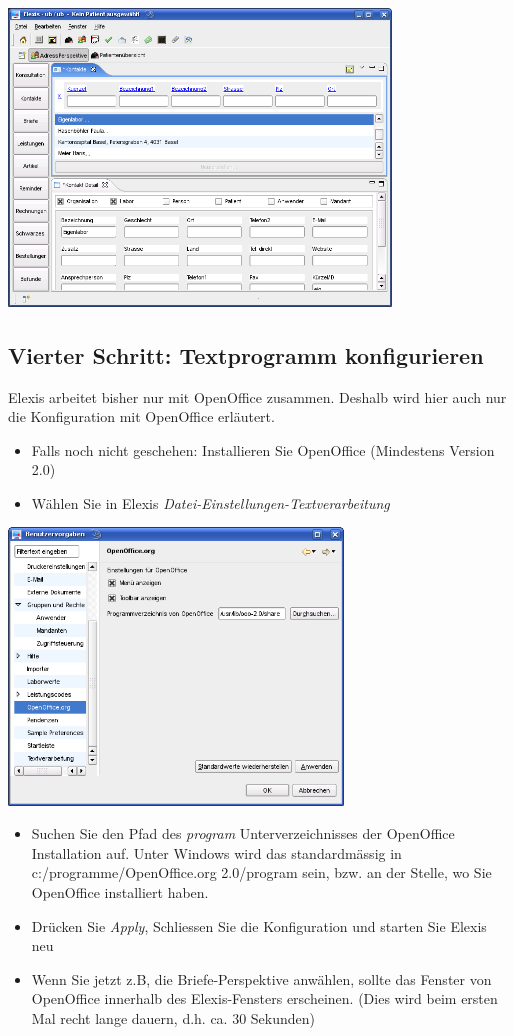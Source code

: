\includegraphics[width=4in]{images/grundkonfmand1.png}
\subsection{Vierter Schritt: Textprogramm konfigurieren}

Elexis arbeitet bisher nur mit OpenOffice zusammen. Deshalb wird hier auch nur die Konfiguration mit OpenOffice erläutert.

\begin{itemize}
 \item Falls noch nicht geschehen: Installieren Sie OpenOffice (Mindestens Version 2.0)
 \item Wählen Sie in Elexis \textit{Datei-Einstellungen-Textverarbeitung}
\end{itemize}

\includegraphics[width=3.5in]{images/grundkonfmand2.png}

\begin{itemize}
 \item Suchen Sie den Pfad des \textit{program} Unterverzeichnisses der OpenOffice Installation auf. Unter Windows wird das standardmässig in c:/programme/OpenOffice.org 2.0/program sein, bzw. an der Stelle, wo Sie OpenOffice installiert haben.
 \item Drücken Sie \textit{Apply}, Schliessen Sie die Konfiguration und starten Sie Elexis neu
 \item Wenn Sie jetzt z.B, die Briefe-Perspektive anwählen, sollte das Fenster von OpenOffice innerhalb des Elexis-Fensters erscheinen. (Dies wird beim ersten Mal recht lange dauern, d.h. ca. 30 Sekunden)
\end{itemize}

